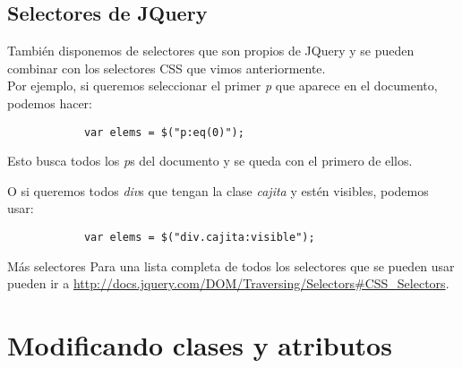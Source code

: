 \documentclass[10pt]{beamer}
\begin{document}
\subsection{Selectores de JQuery}
\begin{frame}[fragile]
	\pause También disponemos de selectores que son propios de JQuery y se pueden combinar con los selectores
			 CSS que vimos anteriormente. \\
	
	\pause Por ejemplo, si queremos seleccionar el primer \emph{p} que aparece en el documento, podemos hacer:
	
	\pause \begin{lstlisting}
			var elems = $("p:eq(0)");
		\end{lstlisting}
	
	\pause Esto busca todos los \emph{p}s del documento y se queda con el primero de ellos.
	
	\pause O si queremos todos \emph{div}s que tengan la clase \emph{cajita} y estén visibles, 
			 podemos usar:
	 
	\pause \begin{lstlisting}
			var elems = $("div.cajita:visible");
		\end{lstlisting}
		
	\pause \begin{block}{Más selectores}
			Para una lista completa de todos los selectores que se pueden usar pueden ir a \url{http://docs.jquery.com/DOM/Traversing/Selectors#CSS_Selectors}.
		\end{block}
\end{frame}

\section{Modificando clases y atributos}
\end{document}
